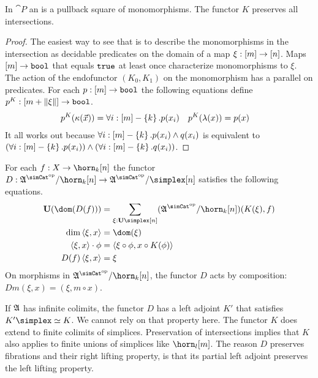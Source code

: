 \documentclass[csh.tex]{subfiles}
\begin{document}
\begin{lemma} In $\cat P$ an  is a pullback square of monomorphisms. The functor $K$ preserves all intersections. \end{lemma}


\begin{proof} The easiest way to see that is to describe the monomorphisms in the intersection as decidable predicates on the domain of a map $\xi:[m]\to[n]$. Maps $[m]\to\mathtt{bool}$ that equals $\mathtt{true}$ at least once characterize monomorphisms to $\xi$. The action of the endofunctor $(K_0,K_1)$ on the monomorphism has a parallel on predicates. For each $p:[m]\to\mathtt{bool}$ the following equations define $p^K: [m+\Vert \xi \Vert]\to\mathtt{bool}$. 
\begin{align*}
p^K(\kappa(\vec x)) &= \forall i:[m]-\left\{k\right\}.p(x_i) &
p^K(\lambda(x)) &= p(x)
\end{align*}
It all works out because $\forall i:[m]-\left\{k\right\}.p(x_i)\land q(x_i)$ is equivalent to $(\forall i:[m]-\left\{k\right\}.p(x_i))\land(\forall i:[m]-\left\{k\right\}.q(x_i))$.
\end{proof}

\begin{definition}
For each $f\of X\to\horn_k[n]$ the functor $D\of \ambient\s/\horn_k[n]\to\ambient\s/\simplex[n]$ satisfies the following equations.
\begin{align*}
\base(\dom(D(f))) &= \sum_{\xi\of\base\simplex[n]}(\ambient\s/\horn_k[n])(K(\xi),f)\\
\dim\tuplet{\xi,x} &= \dom(\xi)\\
\tuplet{\xi,x}\cdot\phi &= \tuplet{\xi\circ\phi,x\circ K(\phi)}\\
D(f)\tuplet{\xi,x} &= \xi
\end{align*}
On morphisms in $\ambient\s/\horn_k[n]$, the functor $D$ acts by composition: $Dm(\xi,x) = (\xi,m\circ x)$. \label{descent functor}
\end{definition}

If $\mathfrak A$ has infinite colimits, the functor $D$ has a left adjoint $K'$ that satisfies $K'\simplex\simeq K$. We cannot rely on that property here. The functor $K$ does extend to finite colimits of simplices. Preservation of intersections implies that $K$ also applies to finite unions of simplices like $\horn_l[m]$. The reason $D$ preserves fibrations and their right lifting property, is that its partial left adjoint preserves the left lifting property. 
\end{document}

